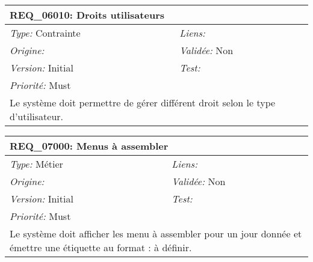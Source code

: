 \begin{table}[!h]

\begin{tabular}{|p{60mm}p{100mm}|}

\hline

\multicolumn{2}{|l|}{\textbf{REQ\_06010:} Droits utilisateurs} \\ \hline

\emph{Type:} Contrainte & \emph{Liens:}  \\

\emph{Origine:}  & \emph{Validée:} Non \\

\emph{Version:} Initial & \emph{Test:}  \\

\emph{Priorité:} Must & \\ \hline

\multicolumn{2}{|p{16cm}|}{Le système doit permettre de gérer différent droit selon le type d'utilisateur.} \\ \hline

\end{tabular}

\end{table}



\begin{table}[!h]

\begin{tabular}{|p{60mm}p{100mm}|}

\hline

\multicolumn{2}{|l|}{\textbf{REQ\_07000:} Menus à assembler} \\ \hline

\emph{Type:} Métier & \emph{Liens:}  \\

\emph{Origine:}  & \emph{Validée:} Non \\

\emph{Version:} Initial & \emph{Test:}  \\

\emph{Priorité:} Must & \\ \hline

\multicolumn{2}{|p{16cm}|}{Le système doit afficher les menu à assembler pour un jour donnée et émettre une étiquette au format : à définir.} \\ \hline

\end{tabular}

\end{table}



